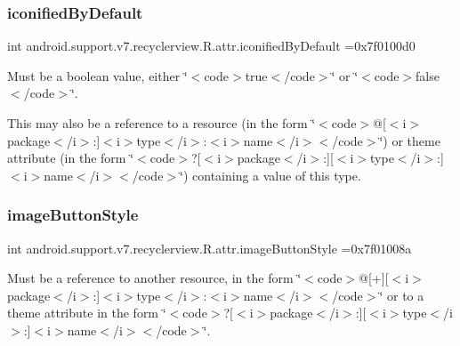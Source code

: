 \subsubsection{\texorpdfstring{iconified\+By\+Default}{iconifiedByDefault}}
{\footnotesize\ttfamily int android.\+support.\+v7.\+recyclerview.\+R.\+attr.\+iconified\+By\+Default =0x7f0100d0\hspace{0.3cm}{\ttfamily [static]}}

Must be a boolean value, either \char`\"{}$<$code$>$true$<$/code$>$\char`\"{} or \char`\"{}$<$code$>$false$<$/code$>$\char`\"{}. 

This may also be a reference to a resource (in the form \char`\"{}$<$code$>$@\mbox{[}$<$i$>$package$<$/i$>$\+:\mbox{]}$<$i$>$type$<$/i$>$\+:$<$i$>$name$<$/i$>$$<$/code$>$\char`\"{}) or theme attribute (in the form \char`\"{}$<$code$>$?\mbox{[}$<$i$>$package$<$/i$>$\+:\mbox{]}\mbox{[}$<$i$>$type$<$/i$>$\+:\mbox{]}$<$i$>$name$<$/i$>$$<$/code$>$\char`\"{}) containing a value of this type. \mbox{\label{classandroid_1_1support_1_1v7_1_1recyclerview_1_1R_1_1attr_ad528c723aad9f957fb845f3e05e9f4a4}} 
\subsubsection{\texorpdfstring{image\+Button\+Style}{imageButtonStyle}}
{\footnotesize\ttfamily int android.\+support.\+v7.\+recyclerview.\+R.\+attr.\+image\+Button\+Style =0x7f01008a\hspace{0.3cm}{\ttfamily [static]}}

Must be a reference to another resource, in the form \char`\"{}$<$code$>$@\mbox{[}+\mbox{]}\mbox{[}$<$i$>$package$<$/i$>$\+:\mbox{]}$<$i$>$type$<$/i$>$\+:$<$i$>$name$<$/i$>$$<$/code$>$\char`\"{} or to a theme attribute in the form \char`\"{}$<$code$>$?\mbox{[}$<$i$>$package$<$/i$>$\+:\mbox{]}\mbox{[}$<$i$>$type$<$/i$>$\+:\mbox{]}$<$i$>$name$<$/i$>$$<$/code$>$\char`\"{}. \mbox{\label{classandroid_1_1support_1_1v7_1_1recyclerview_1_1R_1_1attr_a2624792ec22f9d8c2857189e74ce06ab}} 
